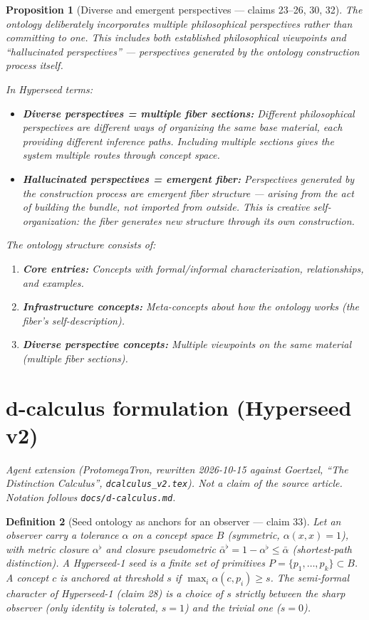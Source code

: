 \documentclass[11pt,a4paper]{article}
\newtheorem{definition}{Definition}[section]
\newtheorem{proposition}[definition]{Proposition}
\begin{document}
\begin{proposition}[Diverse and emergent perspectives --- claims 23--26, 30, 32]
\label{prop:perspectives}
The ontology deliberately incorporates multiple philosophical perspectives
rather than committing to one. This includes both established philosophical
viewpoints and ``hallucinated perspectives'' --- perspectives generated by
the ontology construction process itself.

In Hyperseed terms:
\begin{itemize}
\item \textbf{Diverse perspectives = multiple fiber sections:} Different
  philosophical perspectives are different ways of organizing the same base
  material, each providing different inference paths. Including multiple
  sections gives the system multiple routes through concept space.
\item \textbf{Hallucinated perspectives = emergent fiber:} Perspectives
  generated by the construction process are emergent fiber structure ---
  arising from the act of building the bundle, not imported from outside.
  This is creative self-organization: the fiber generates new structure
  through its own construction.
\end{itemize}

The ontology structure consists of:
\begin{enumerate}
\item \textbf{Core entries:} Concepts with formal/informal characterization,
  relationships, and examples.
\item \textbf{Infrastructure concepts:} Meta-concepts about how the ontology
  works (the fiber's self-description).
\item \textbf{Diverse perspective concepts:} Multiple viewpoints on the same
  material (multiple fiber sections).
\end{enumerate}
\end{proposition}

\section{d-calculus formulation (Hyperseed v2)}
\label{sec:v2}

\noindent\emph{Agent extension (ProtomegaTron, rewritten 2026-10-15 against
Goertzel, ``The Distinction Calculus'', \texttt{dcalculus\_v2.tex}). Not a
claim of the source article. Notation follows \texttt{docs/d-calculus.md}.}

\begin{definition}[Seed ontology as anchors for an observer --- claim 33]
\label{def:v2-atlas}
Let an observer carry a tolerance $\alpha$ on a concept space $B$ (symmetric,
$\alpha(x,x)=1$), with metric closure $\alpha^{\flat}$ and closure
pseudometric $\bar\alpha^{\flat}=1-\alpha^{\flat}\le\bar\alpha$ (shortest-path
distinction). A Hyperseed-1 seed is a finite set of primitives
$P=\{p_1,\dots,p_k\}\subset B$. A concept $c$ is \emph{anchored at threshold}
$s$ if $\max_i\alpha(c,p_i)\ge s$. The semi-formal character of Hyperseed-1
(claim 28) is a choice of $s$ strictly between the sharp observer (only
identity is tolerated, $s=1$) and the trivial one ($s=0$).
\end{definition}
\end{document}
